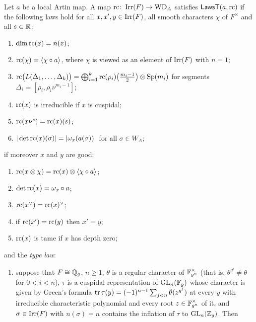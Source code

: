 \begin{definition}\label{def:rectexists}
Let $a$ be a local Artin map. A map $\mathrm{rc}\colon\operatorname{Irr}(F)\to\mathrm{WD}_A$ satisfies
$\mathsf{LawsT}(a,\mathrm{rc})$ if the following laws hold for all $x,x',y\in\operatorname{Irr}(F)$, all smooth
characters $\chi$ of $F^\times$ and all $s\in\mathbb{R}$:
\begin{enumerate}[label=(L\arabic*),leftmargin=3.2em,nosep]
\item $\dim\mathrm{rc}(x)=n(x)$;
\item $\mathrm{rc}(\chi)=\langle\chi\circ a\rangle$, where $\chi$ is viewed as an element of
  $\operatorname{Irr}(F)$ with $n=1$;
\item $\mathrm{rc}\bigl(L(\Delta_1,\dots,\Delta_k)\bigr)=\bigoplus_{i=1}^k\mathrm{rc}(\rho_i)\bigl(\tfrac{m_i-1}2\bigr)
  \otimes\operatorname{Sp}(m_i)$ for segments $\Delta_i=[\rho_i,\rho_i\nu^{m_i-1}]$;
\item $\mathrm{rc}(x)$ is irreducible if $x$ is cuspidal;
\item $\mathrm{rc}(x\nu^s)=\mathrm{rc}(x)(s)$;
\item $|\det\mathrm{rc}(x)(\sigma)|=|\omega_x(a(\sigma))|$ for all $\sigma\in W_A$;
\end{enumerate}
if moreover $x$ and $y$ are good:
\begin{enumerate}[label=(L\arabic*),leftmargin=3.2em,start=7,nosep]
\item $\mathrm{rc}(x\otimes\chi)=\mathrm{rc}(x)\otimes\langle\chi\circ a\rangle$;
\item $\det\mathrm{rc}(x)=\omega_x\circ a$;
\item $\mathrm{rc}(x^\vee)=\mathrm{rc}(x)^\vee$;
\item if $\mathrm{rc}(x')=\mathrm{rc}(y)$ then $x'=y$;
\item $\mathrm{rc}(x)$ is tame if $x$ has depth zero;
\end{enumerate}
and the \emph{type law}:
\begin{enumerate}[label=(L\arabic*),leftmargin=3.2em,start=12,nosep]
\item suppose that $F\cong\mathbb{Q}_g$, $n\ge1$, $\theta$ is a regular character of $\mathbb{F}_{g^n}^\times$ (that
  is, $\theta^{g^i}\ne\theta$ for $0<i<n$), $\tau$ is a cuspidal representation of $\operatorname{GL}_n(\mathbb{F}_g)$ whose
  character is given by Green's formula $\operatorname{tr}\tau(y)=(-1)^{n-1}\sum_{j<n}\theta(z^{g^j})$ at every $y$
  with irreducible characteristic polynomial and every root $z\in\mathbb{F}_{g^n}^\times$ of it, and
  $\sigma\in\operatorname{Irr}(F)$ with $n(\sigma)=n$ contains the inflation of $\tau$ to $\operatorname{GL}_n(\mathbb{Z}_g)$. Then

\end{enumerate}
\end{definition}
